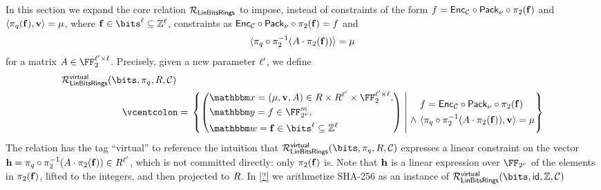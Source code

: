 \documentclass[11pt,letterpaper,usenames,dvipsnames]{article}
\begin{document}
In this section we expand the core relation $\mathcal{R}_{\mathsf{LinBitsRings}}$ to impose, instead of constraints of the form $f=\mathsf{Enc}_{\mathcal{C}}\circ \mathsf{Pack}_\nu\circ \pi_2(\mathbf{f})$ and $\langle \pi_q(\mathbf{f}), \mathbf{v}  \rangle = \mu$, where $\bff\in \bits^{\codedim} \subseteq \ZZ^{\codedim}$, constraints as $\mathsf{Enc}_{\mathcal{C}}\circ\mathsf{Pack}_\nu\circ\pi_2(\mathbf{f}) = f$  and $$\langle \pi_q\circ \pi_2^{-1}(A\cdot \pi_2(\mathbf{f})) \rangle = \mu$$ for a matrix $\Mmatrix\in \FF_{2}^{\codedim' \times \codedim}$. Precisely, given a new parameter $\ell'$, we define 
%
\begin{align*}
&\LinBitsDual^\virtual(\bits,\pi_q, \evalfield,\cC)\\ &\qquad \qquad \qquad \defeq \left\{ \left(\begin{aligned} &\inp=(\mu, \vv, \Mmatrix)\in \evalfield \times \evalfield^{\codedim'} \times \FF_2^{\codedim' \times \codedim}, \\&\oracle = f \in \comfield^\codelength, \\ &\wit= \bff\in \bits^\codedim \subseteq \ZZ^\codedim\end{aligned}\right) \;\middle|\;  \begin{aligned} &f=\Enc_{\cC}\circ \pack \circ \picomfield(\bff)\\ \wedge \  & \langle \pi_q\circ \pi_2^{-1}(\Mmatrix \cdot \pi_2(\bff)), \vv\rangle  = \mu  \end{aligned} \right\}
\end{align*}
%
The relation has the tag ``virtual'' to reference the intuition that  $\LinBitsDual^\virtual(\bits,\pi_q, \evalfield,\cC)$ expresses a linear constraint on the vector $\mathbf{h}=\pi_q\circ \pi_2^{-1}(A \cdot \pi_2(\mathbf{f}))\in R^{\ell'}$, which is not committed directly: only $\pi_2(\mathbf{f})$  is. Note that $\mathbf{h}$ is a linear expression over $\comfield$ of the elements in $\pi_2(\mathbf{f})$, lifted to the integers, and then projected to $R$. In \cref{?} we arithmetize SHA-256 as an instance of $\LinBitsDual^\virtual(\bits,\mathsf{id}, \ZZ,\cC)$ 
\end{document}
